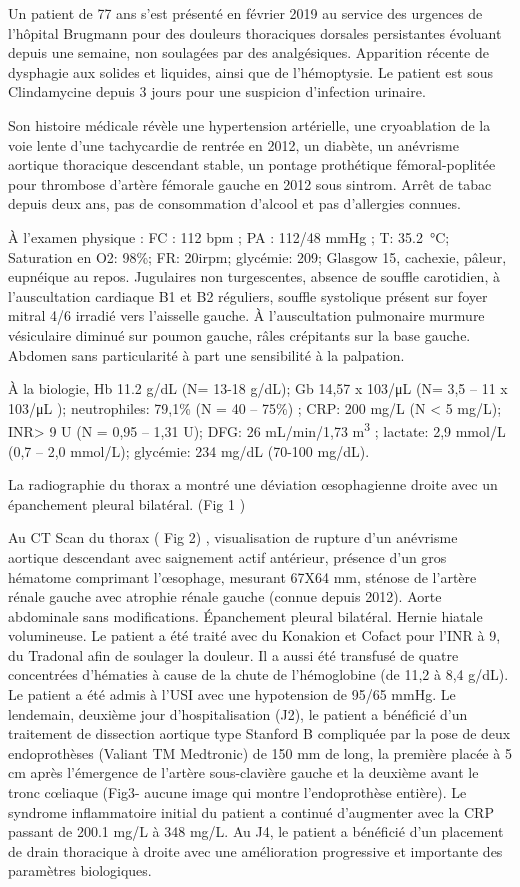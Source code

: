 \documentclass[./tfe]{subfiles}
\begin{document}
Un patient de 77 ans s’est présenté en février 2019 au service des urgences de l'hôpital Brugmann pour des douleurs thoraciques dorsales persistantes évoluant depuis une semaine, non soulagées par des analgésiques. Apparition récente de dysphagie aux solides et liquides, ainsi que de l’hémoptysie. Le patient est sous Clindamycine depuis 3 jours pour une suspicion d’infection urinaire.

Son histoire médicale révèle une hypertension artérielle, une cryoablation de la voie lente d’une tachycardie de rentrée en 2012, un diabète, un anévrisme aortique thoracique descendant stable, un pontage prothétique fémoral-poplitée pour thrombose d'artère fémorale gauche en 2012 sous sintrom. Arrêt de tabac depuis deux ans, pas de consommation d’alcool et pas d’allergies connues.

À l'examen physique : FC : 112 bpm ; PA : 112/48 mmHg ; T: \SI{35.2}{\celsius}; Saturation en O2: 98\%; FR: 20irpm; glycémie: 209; Glasgow 15, cachexie, pâleur, eupnéique au repos. Jugulaires non turgescentes, absence de souffle carotidien, à l’auscultation cardiaque B1 et B2 réguliers, souffle systolique présent sur foyer mitral 4/6 irradié vers l'aisselle gauche. À l’auscultation pulmonaire murmure vésiculaire diminué sur poumon gauche, râles crépitants sur la base gauche. Abdomen sans particularité à part une sensibilité à la palpation.

À la biologie, Hb 11.2 g/dL (N= 13-18 g/dL); Gb 14,57 x 103/\si{\micro\liter} (N= 3,5 – 11 x 103/\si{\micro\liter} ); neutrophiles: 79,1\% (N = 40 – 75\%) ; CRP: 200 mg/L (N < 5 mg/L); INR> 9 U (N = 0,95 – 1,31 U); DFG: 26 mL/min/1,73 \si{\cubic\meter} ; lactate: 2,9 mmol/L (0,7 – 2,0 mmol/L); glycémie: 234 mg/dL (70-100 mg/dL).

La radiographie du thorax a montré une déviation œsophagienne droite avec un épanchement pleural bilatéral. (Fig 1 )

Au CT Scan du thorax ( Fig 2) , visualisation de rupture d'un anévrisme aortique descendant avec saignement actif antérieur, présence d'un gros hématome comprimant l'œsophage, mesurant 67X64 mm, sténose de l'artère rénale gauche avec atrophie rénale gauche (connue depuis 2012). Aorte abdominale sans modifications. Épanchement pleural bilatéral. Hernie hiatale volumineuse. Le patient a été traité avec du Konakion et Cofact pour l’INR à 9, du Tradonal afin de soulager la douleur. Il a aussi été transfusé de quatre concentrées d’hématies à cause de la chute de l’hémoglobine (de 11,2 à 8,4 g/dL). Le patient a été admis à l'USI avec une hypotension de 95/65 mmHg. Le lendemain, deuxième jour d'hospitalisation (J2), le patient a bénéficié d'un traitement de dissection aortique type Stanford B compliquée par la pose de deux endoprothèses (Valiant TM Medtronic) de 150 mm de long, la première placée à 5 cm après l'émergence de l'artère sous-clavière gauche et la deuxième avant le tronc cœliaque (Fig3- aucune image qui montre l’endoprothèse entière). Le syndrome inflammatoire initial du patient a continué d’augmenter avec la CRP passant de 200.1 mg/L à 348 mg/L. Au J4, le patient a bénéficié d’un placement de drain thoracique à droite avec une amélioration progressive et importante des paramètres biologiques.
\end{document}
